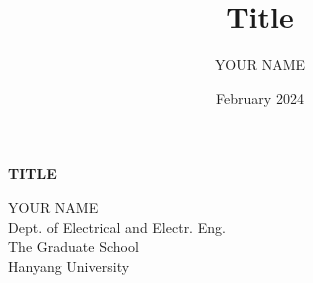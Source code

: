 \documentclass[a4paper,12pt]{HYU}
\date{February 2024}
\title{Title}
\author{YOUR NAME}
\makeatletter
\renewenvironment{abstract}{%
    \if@twocolumn
      \section*{\abstractname}%
    \else %
      \begin{center}%
        {\bfseries \Large\abstractname\vspace{\z@}}%
      \end{center}%
      \quotation
    \fi}
    {\if@twocolumn\else\endquotation\fi}
\makeatother
\begin{document}
\maketitle


\tableofcontents
\listoffigures
\listoftables
\abbreviations
\makenomenclature
\renewcommand{\nomname}{List of Abbreviations}
\printnomenclature
\hfill %




\newpage
\begin{abstract}
\begin{center}
\textbf{\fontsize{13pt}{13} \selectfont  TITLE}
\end{center}
\end{abstract}

\begin{flushleft}
\hspace{7.5cm} {\fontsize{11pt}{16} \selectfont YOUR NAME}\\
\hspace{7.5cm} {\fontsize{11pt}{16} \selectfont Dept. of Electrical and Electr. Eng.} \\
\hspace{7.5cm} {\fontsize{11pt}{16} \selectfont The Graduate School}\\
\hspace{7.5cm} {\fontsize{11pt}{16} \selectfont Hanyang University}
\end{flushleft}



\mainmatter






\makebibliography
\nocite{*}
\restoregeometry
\end{document}
